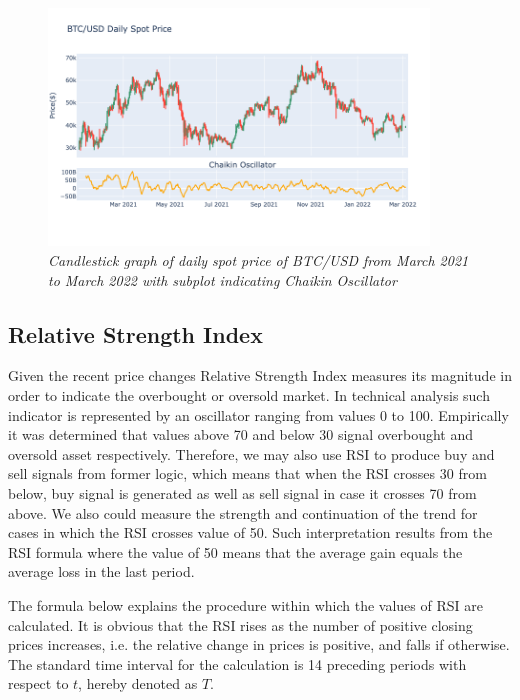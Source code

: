 \begin{figure}[ht]

\begin{center}
	\includegraphics[width=0.9\textwidth]{Figs/Chaikin.png}
\end{center}

\caption{\textit{ Candlestick graph of daily spot price of BTC/USD from March 2021 to March 2022 with subplot indicating Chaikin Oscillator}}

\end{figure}


\subsection{Relative Strength Index}

Given the recent price changes Relative Strength Index measures its magnitude in order to indicate the overbought or oversold market. In technical analysis such indicator is represented by an oscillator ranging from values 0 to 100. Empirically 
it was determined that values above 70 and below 30 signal overbought and oversold asset respectively. Therefore, we may also use RSI to produce buy and sell signals from former logic, which means that when the RSI crosses 30 from below, buy signal is generated as well as sell signal in case it crosses 70 from above. We also could measure the strength and continuation of the trend for cases in which the RSI crosses value of 50. Such interpretation results from the RSI formula where the value of 50 means that the average gain equals the average loss in the last period.

The formula below explains the procedure within which the values of RSI are calculated. It is obvious that the RSI rises as the number of positive closing prices increases, i.e. the relative change in prices is positive, and falls if otherwise. The standard time interval for  the calculation is 14 preceding periods with respect to $t$, hereby denoted as $T$.

